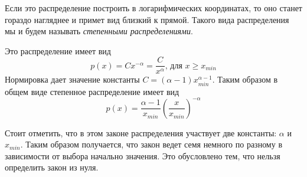 Если это распределение построить в логарифмических координатах, то оно станет гораздо нагляднее и примет вид близкий к прямой. Такого вида распределения мы и будем называть \textit{степенными распределениями}. 

Это распределение имеет вид \cite{zhukov} $$ p(x) = Cx^{-\alpha} = \frac{C}{x^\alpha} \text{, для } x \ge x_{min} $$ 
Нормировка дает значение константы $C = (\alpha - 1) x_{min}^{\alpha - 1}$.
Таким образом в общем виде степенное распределение имеет вид $$p(x) = \frac{\alpha - 1}{x_{min}} \left( \frac{x}{x_{min}} \right)^{-\alpha}$$

Стоит отметить, что в этом законе распределения участвует две константы: $\alpha$ и $x_{min}$. Таким образом получается, что закон ведет семя немного по разному в зависимости от выбора начально значения. Это обусловлено тем, что нельзя определить закон из нуля.